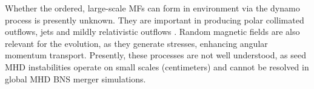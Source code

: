 Whether the ordered, large-scale \acp{MF} can form in \pmerg{} environment 
via the dynamo process is presently unknown. They are important in producing 
polar collimated outflows, jets \citep{Bucciantini:2011kx,Ruiz:2016rai} and mildly relativistic 
outflows \citep{Metzger:2018qfl,Fernandez:2018kax}. Random magnetic fields are also 
relevant for the \pmerg{} evolution, as they generate stresses, enhancing angular momentum transport. 
Presently, these processes are not well understood, as seed \ac{MHD} instabilities operate 
on small scales (centimeters) and cannot be resolved in global \ac{MHD} \ac{BNS} merger 
simulations.




